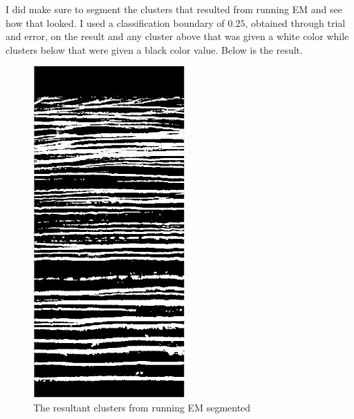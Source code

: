 \documentclass[11pt,psfig]{article}
\begin{document}
I did make sure to segment the clusters that resulted from running EM and see how that looked. I used a classification boundary of $0.25$, obtained through trial and error, on the result and any cluster above that was given a white color while clusters below that were given a black color value. Below is the result.
\begin{figure}[H]
\centering
\includegraphics[height=5in]{emResultSegmented.jpg}
\caption{The resultant clusters from running EM segmented}
\end{figure}
\end{document}

